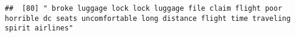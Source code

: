 \documentclass[
]{article}
\begin{document}
\begin{verbatim}
##  [80] " broke luggage lock lock luggage file claim flight poor horrible dc seats uncomfortable long distance flight time traveling spirit airlines"                                                                                                                                                                                                                                                                                                                                                                                                                                                                                                                                                                                                                                                                                                                                                                                                                                                                                                                                                                                                                                                                                                                                                                                                                                                                                                                                                                                                                                                                                                                                                                                                                                                   

\end{verbatim}
\end{document}
